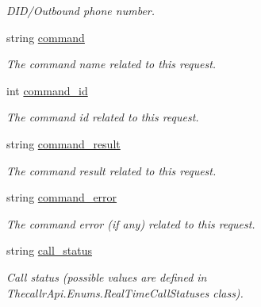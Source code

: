 \begin{DoxyCompactItemize}
\begin{DoxyCompactList}\small\item\em D\+I\+D/\+Outbound phone number. \end{DoxyCompactList}\item 
string \hyperlink{class_thecallr_api_1_1_objects_1_1_real_time_1_1_request_aab93436f8f9491a59ddae770cb418275}{command}
\begin{DoxyCompactList}\small\item\em The command name related to this request. \end{DoxyCompactList}\item 
int \hyperlink{class_thecallr_api_1_1_objects_1_1_real_time_1_1_request_a4d625a8e9e5b43dc7bcec57fac38eec9}{command\+\_\+id}
\begin{DoxyCompactList}\small\item\em The command id related to this request. \end{DoxyCompactList}\item 
string \hyperlink{class_thecallr_api_1_1_objects_1_1_real_time_1_1_request_a8758947fb3991ef5faa67febed4f558d}{command\+\_\+result}
\begin{DoxyCompactList}\small\item\em The command result related to this request. \end{DoxyCompactList}\item 
string \hyperlink{class_thecallr_api_1_1_objects_1_1_real_time_1_1_request_a882e151a5315eab6d4a15b63d434785c}{command\+\_\+error}
\begin{DoxyCompactList}\small\item\em The command error (if any) related to this request. \end{DoxyCompactList}\item 
string \hyperlink{class_thecallr_api_1_1_objects_1_1_real_time_1_1_request_a679ba6811aae07b3dd93d91690b72005}{call\+\_\+status}
\begin{DoxyCompactList}\small\item\em Call status (possible values are defined in Thecallr\+Api.\+Enums.\+Real\+Time\+Call\+Statuses class). \end{DoxyCompactList}\item 

\end{DoxyCompactItemize}
